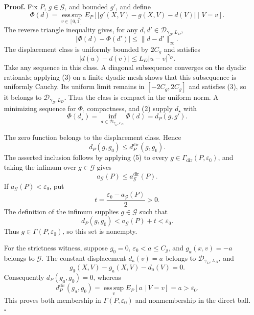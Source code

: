 \textbf{Proof.}
Fix \(P\), \(g\in\mathcal G\), and bounded \(g'\), and define
\[
 \Phi(d)=\operatorname*{ess\,sup}_{v\in[0,1]}
 E_P\!\left[|g'(X,V)-g(X,V)-d(V)|\mid V=v\right]. \tag{1}
\]
The reverse triangle inequality gives, for any \(d,d'\in\mathcal D_{\gamma_D,L_D}\),
\[
 |\Phi(d)-\Phi(d')|\le\|d-d'\|_\infty. \tag{2}
\]
The displacement class is uniformly bounded by \(2C_g\) and satisfies
\[
 |d(u)-d(v)|\le L_D|u-v|^{\gamma_D}. \tag{3}
\]
Take any sequence in this class.  A diagonal subsequence converges on the dyadic rationals; applying (3) on a finite dyadic mesh shows that this subsequence is uniformly Cauchy.  Its uniform limit remains in \([-2C_g,2C_g]\) and satisfies (3), so it belongs to \(\mathcal D_{\gamma_D,L_D}\).  Thus the class is compact in the uniform norm.  A minimizing sequence for \(\Phi\), compactness, and (2) supply \(d_\star\) with
\[
 \Phi(d_\star)=\inf_{d\in\mathcal D_{\gamma_D,L_D}}\Phi(d)=d_P(g,g'). \tag{4}
\]

The zero function belongs to the displacement class.  Hence
\[
 d_P(g,g_0)\le d_P^{\mathrm{dir}}(g,g_0). \tag{5}
\]
The asserted inclusion follows by applying (5) to every \(g\in\Gamma_{\mathrm{dir}}(P,\varepsilon_0)\), and taking the infimum over \(g\in\mathcal G\) gives
\[
 a_{\mathcal G}(P)\le a_{\mathcal G}^{\mathrm{dir}}(P). \tag{6}
\]
If \(a_{\mathcal G}(P)<\varepsilon_0\), put
\[
 t=\frac{\varepsilon_0-a_{\mathcal G}(P)}2>0.
\]
The definition of the infimum supplies \(g\in\mathcal G\) such that
\[
 d_P(g,g_0)<a_{\mathcal G}(P)+t<\varepsilon_0. \tag{7}
\]
Thus \(g\in\Gamma(P,\varepsilon_0)\), so this set is nonempty.

For the strictness witness, suppose \(g_0=0\), \(\varepsilon_0<a\le C_g\), and \(g_a(x,v)=-a\) belongs to \(\mathcal G\).  The constant displacement \(d_a(v)=a\) belongs to \(\mathcal D_{\gamma_D,L_D}\), and
\[
 g_0(X,V)-g_a(X,V)-d_a(V)=0.
\]
Consequently \(d_P(g_a,g_0)=0\), whereas
\[
 d_P^{\mathrm{dir}}(g_a,g_0)
 =\operatorname*{ess\,sup}_{v}E_P[a\mid V=v]=a>\varepsilon_0. \tag{8}
\]
This proves both membership in \(\Gamma(P,\varepsilon_0)\) and nonmembership in the direct ball. \(\square\)